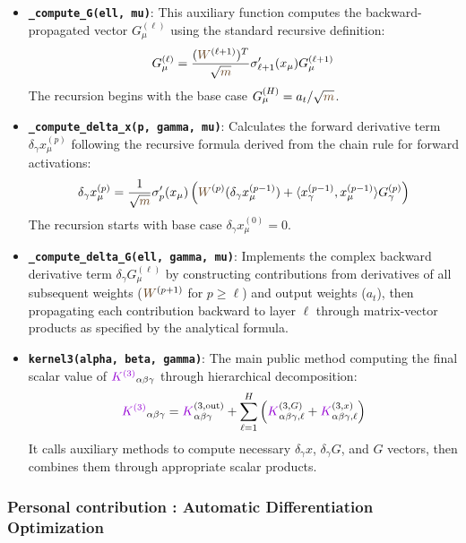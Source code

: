 \documentclass[a4paper]{article}
\newcommand{\W}{\textcolor{weightcolor}{W}}
\newcommand{\m}{\textcolor{weightcolor}{m}}
\theoremstyle{plain}
\theoremstyle{definition}
\theoremstyle{remark}
\begin{document}
\begin{itemize}
    \item \textbf{\texttt{\_compute\_G(ell, mu)}}: This auxiliary function computes the backward-propagated vector $G^{(\ell)}_\mu$ using the standard recursive definition:
    \[ G^{(\ell)}_\mu = \frac{(\W^{(\ell+1)})^T}{\sqrt{\m}} \sigma'_{\ell+1}(x_\mu) G^{(\ell+1)}_\mu \]
    The recursion begins with the base case $G^{(H)}_\mu = a_t / \sqrt{\m}$.
    
    \item \textbf{\texttt{\_compute\_delta\_x(p, gamma, mu)}}: Calculates the forward derivative term $\delta_\gamma x^{(p)}_\mu$ following the recursive formula derived from the chain rule for forward activations:
    \[ \delta_\gamma x^{(p)}_\mu = \frac{1}{\sqrt{\m}} \sigma'_{p}(x_\mu) \left( \W^{(p)} (\delta_\gamma x^{(p-1)}_\mu) + \langle x^{(p-1)}_\gamma, x^{(p-1)}_\mu \rangle G^{(p)}_\gamma \right) \]
    The recursion starts with base case $\delta_\gamma x^{(0)}_\mu = 0$.
    
    \item \textbf{\texttt{\_compute\_delta\_G(ell, gamma, mu)}}: Implements the complex backward derivative term $\delta_\gamma G^{(\ell)}_\mu$ by constructing contributions from derivatives of all subsequent weights ($\W^{(p+1)}$ for $p \ge \ell$) and output weights ($a_t$), then propagating each contribution backward to layer $\ell$ through matrix-vector products as specified by the analytical formula.
    
    \item \textbf{\texttt{kernel3(alpha, beta, gamma)}}: The main public method computing the final scalar value of $\textcolor{k3color}{K^{(3)}}_{\alpha\beta\gamma}$ through hierarchical decomposition:
    \[ \textcolor{k3color}{K^{(3)}}_{\alpha\beta\gamma} = \textcolor{k3color}{K}^{(3, \text{out})}_{\alpha\beta\gamma} + \sum_{\ell=1}^H \left( \textcolor{k3color}{K}^{(3, G)}_{\alpha\beta\gamma, \ell} + \textcolor{k3color}{K}^{(3, x)}_{\alpha\beta\gamma, \ell} \right) \]
    It calls auxiliary methods to compute necessary $\delta_\gamma x$, $\delta_\gamma G$, and $G$ vectors, then combines them through appropriate scalar products.
\end{itemize}




\subsubsection{Personal contribution : Automatic Differentiation Optimization}
\end{document}
